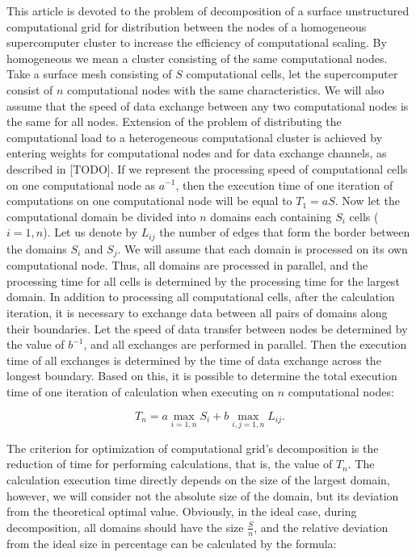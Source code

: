 \documentclass[
11pt,%
tightenlines,%
twoside,%
onecolumn,%
nofloats,%
nobibnotes,%
nofootinbib,%
superscriptaddress,%
noshowpacs,%
centertags]%
{revtex4}
\begin{document}
This article is devoted to the problem of decomposition of a surface unstructured computational grid for distribution between the nodes of a homogeneous supercomputer cluster  to increase the efficiency of computational scaling.
By homogeneous we mean a cluster consisting of the same computational nodes.
Take a surface mesh consisting of $ S $ computational cells, let the supercomputer consist of $ n $ computational nodes with the same characteristics.
We will also assume that the speed of data exchange between any two computational nodes is the same for all nodes.
Extension of the problem of distributing the computational load to a heterogeneous computational cluster is achieved by entering weights for computational nodes and for data exchange channels, as described in [TODO].
If we represent the processing speed of computational cells on one computational node as $ a^{-1} $, then the execution time of one iteration of computations on one computational node will be equal to $ T_1 = aS $.
Now let the computational domain be divided into $ n $ domains each containing $ S_i $ cells ($ i = 1, n $).
Let us denote by $ L_{ij} $ the number of edges that form the border between the domains $ S_i $ and $ S_j $.
We will assume that each domain is processed on its own computational node.
Thus, all domains are processed in parallel, and the processing time for all cells is determined by the processing time for the largest domain.
In addition to processing all computational cells, after the calculation iteration, it is necessary to exchange data between all pairs of domains along their boundaries.
Let the speed of data transfer between nodes be determined by the value of $ b^{-1} $, and all exchanges are performed in parallel.
Then the execution time of all exchanges is determined by the time of data exchange across the longest boundary.
Based on this, it is possible to determine the total execution time of one iteration of calculation when executing on $ n $ computational nodes:

\begin{equation}
T_n = a \max_{i = 1,n}{S_i} + b \max_{i,j=1,n}{L_{ij}}.
\end{equation}

The criterion for optimization of computational grid's decomposition is the reduction of time for performing calculations, that is, the value of $ T_n $.
The calculation execution time directly depends on the size of the largest domain, however, we will consider not the absolute size of the domain, but its deviation from the theoretical optimal value.
Obviously, in the ideal case, during decomposition, all domains should have the size $ \frac{S}{n} $, and the relative deviation from the ideal size in percentage can be calculated by the formula:
\end{document}
